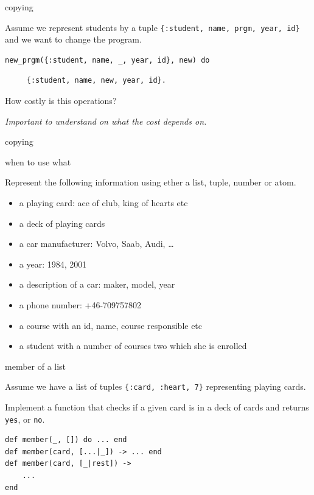 \begin{frame}[fragile]{copying}

  Assume we represent students by a tuple {\tt \{:student, name, prgm,
    year, id\}} and we want to change the program.

\pause
\begin{verbatim}
new_prgm({:student, name, _, year, id}, new) do \end{verbatim}\pause\begin{verbatim}
     {:student, name, new, year, id}.
\end{verbatim}

\pause

How costly is this operations?

\vspace{10pt}
{\em Important to understand on what the cost depends on.}

\end{frame}


\begin{frame}{copying}

\end{frame}

\begin{frame}{when to use what}

Represent the following information using ether a list, tuple, number or atom.
                   
\begin{itemize}
\item a playing card: ace of club, king of hearts etc
\item a deck of playing cards
\item a car manufacturer: Volvo, Saab, Audi, \ldots
\item a year: 1984, 2001
\item a description of a car: maker, model, year
\item a phone number: +46-709757802
\item a course with an id, name, course responsible etc
\item a student with a number of courses two which she is enrolled
\end{itemize}

\end{frame}

\begin{frame}[fragile]{member of a list}

Assume we have a list of tuples {\tt \{:card, :heart, 7\}} representing playing cards. 
\pause

\vspace{10pt}
Implement a function that checks if a given card is in a deck of cards and returns {\tt yes}, or {\tt no}.

\begin{verbatim}
def member(_, []) do ... end
def member(card, [...|_]) -> ... end
def member(card, [_|rest]) -> 
    ... 
end
\end{verbatim}

\end{frame}

